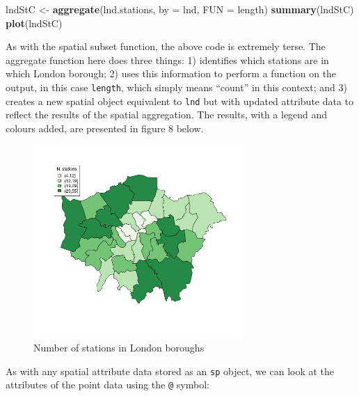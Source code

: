 \documentclass[]{article}
\newenvironment{Shaded}{}{}
\newcommand{\KeywordTok}[1]{\textcolor[rgb]{0.00,0.44,0.13}{\textbf{{#1}}}}
\newcommand{\DataTypeTok}[1]{\textcolor[rgb]{0.56,0.13,0.00}{{#1}}}
\newcommand{\NormalTok}[1]{{#1}}
\let\Oldincludegraphics\includegraphics
\renewcommand{\includegraphics}[1]{\Oldincludegraphics[width=8cm]{#1}}
\begin{document}
\begin{Shaded}
\begin{Highlighting}[]
\NormalTok{lndStC <- }\KeywordTok{aggregate}\NormalTok{(lnd.stations, }\DataTypeTok{by =} \NormalTok{lnd, }\DataTypeTok{FUN =} \NormalTok{length)}
\KeywordTok{summary}\NormalTok{(lndStC)}
\KeywordTok{plot}\NormalTok{(lndStC)}
\end{Highlighting}
\end{Shaded}
As with the spatial subset function, the above code is extremely terse.
The aggregate function here does three things: 1) identifies which
stations are in which London borough; 2) uses this information to
perform a function on the output, in this case \texttt{length}, which
simply means ``count'' in this context; and 3) creates a new spatial
object equivalent to \texttt{lnd} but with updated attribute data to
reflect the results of the spatial aggregation. The results, with a
legend and colours added, are presented in figure 8 below.

\begin{figure}[htbp]
\centering
\includegraphics{figure/nStations.png}
\caption{Number of stations in London boroughs}
\end{figure}

As with any spatial attribute data stored as an \texttt{sp} object, we
can look at the attributes of the point data using the \texttt{@}
symbol:
\end{document}
